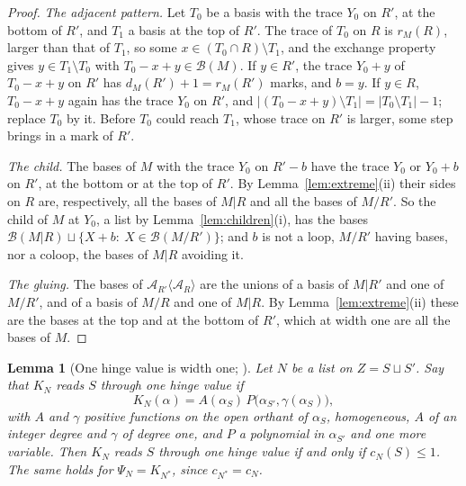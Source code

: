 \documentclass[11pt]{article}
\theoremstyle{plain}
\newtheorem{lemma}[prop]{Lemma}
\theoremstyle{definition}
\theoremstyle{remark}
\newcommand{\cB}{\mathcal B}
\begin{document}
\begin{proof}
\emph{The adjacent pattern.} Let $T_0$ be a basis with the trace $Y_0$ on $R'$, at the bottom of $R'$, and $T_1$ a basis at the top of $R'$. The trace of $T_0$ on $R$ is $r_M(R)$, larger than that of $T_1$, so some $x\in(T_0\cap R)\setminus T_1$, and the exchange property gives $y\in T_1\setminus T_0$ with $T_0-x+y\in\cB(M)$. If $y\in R'$, the trace $Y_0+y$ of $T_0-x+y$ on $R'$ has $d_M(R')+1=r_M(R')$ marks, and $b=y$. If $y\in R$, $T_0-x+y$ again has the trace $Y_0$ on $R'$, and $|(T_0-x+y)\setminus T_1|=|T_0\setminus T_1|-1$; replace $T_0$ by it. Before $T_0$ could reach $T_1$, whose trace on $R'$ is larger, some step brings in a mark of $R'$.

\emph{The child.} The bases of $M$ with the trace $Y_0$ on $R'-b$ have the trace $Y_0$ or $Y_0+b$ on $R'$, at the bottom or at the top of $R'$. By Lemma~\ref{lem:extreme}(ii) their sides on $R$ are, respectively, all the bases of $M|R$ and all the bases of $M/R'$. So the child of $M$ at $Y_0$, a list by Lemma~\ref{lem:children}(i), has the bases $\cB(M|R)\sqcup\{X+b:\ X\in\cB(M/R')\}$; and $b$ is not a loop, $M/R'$ having bases, nor a coloop, the bases of $M|R$ avoiding it.

\emph{The gluing.} The bases of $\mathcal A_{R'}\langle\mathcal A_R\rangle$ are the unions of a basis of $M|R'$ and one of $M/R'$, and of a basis of $M/R$ and one of $M|R$. By Lemma~\ref{lem:extreme}(ii) these are the bases at the top and at the bottom of $R'$, which at width one are all the bases of $M$.
\end{proof}

\begin{lemma}[One hinge value is width one; {\cite[Thm.~18.6, p.~116]{F}}]\label{lem:onehinge}
Let $N$ be a list on $Z=S\sqcup S'$. Say that $K_N$ \emph{reads $S$ through one hinge value} if
\[
K_N(\alpha)=A(\alpha_S)\,P\big(\alpha_{S'},\gamma(\alpha_S)\big),
\]
with $A$ and $\gamma$ positive functions on the open orthant of $\alpha_S$, homogeneous, $A$ of an integer degree and $\gamma$ of degree one, and $P$ a polynomial in $\alpha_{S'}$ and one more variable. Then $K_N$ reads $S$ through one hinge value if and only if $c_N(S)\le1$. The same holds for $\Psi_N=K_{N^\ast}$, since $c_{N^\ast}=c_N$.
\end{lemma}
\end{document}

